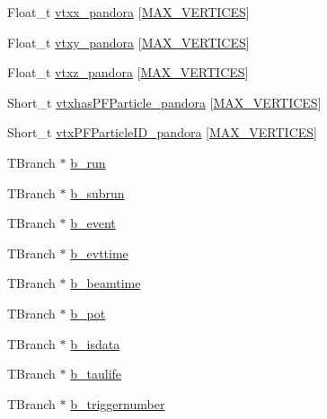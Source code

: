 \begin{DoxyCompactItemize}
\item 
Float\-\_\-t \hyperlink{classanatree_ae702221266aaf398574e6c0a4b956e41}{vtxx\-\_\-pandora} \mbox{[}\hyperlink{anatree__core__v09410002_8h_a6ac49acb0970e608315ca232a9fc8828}{M\-A\-X\-\_\-\-V\-E\-R\-T\-I\-C\-E\-S}\mbox{]}
\item 
Float\-\_\-t \hyperlink{classanatree_a3ada5e38c3707cf6b65ded5d0aed1be5}{vtxy\-\_\-pandora} \mbox{[}\hyperlink{anatree__core__v09410002_8h_a6ac49acb0970e608315ca232a9fc8828}{M\-A\-X\-\_\-\-V\-E\-R\-T\-I\-C\-E\-S}\mbox{]}
\item 
Float\-\_\-t \hyperlink{classanatree_a526781b4d6a3cf93890c000047381e8b}{vtxz\-\_\-pandora} \mbox{[}\hyperlink{anatree__core__v09410002_8h_a6ac49acb0970e608315ca232a9fc8828}{M\-A\-X\-\_\-\-V\-E\-R\-T\-I\-C\-E\-S}\mbox{]}
\item 
Short\-\_\-t \hyperlink{classanatree_aa870ef7aa82c721a5711a6ffae151c53}{vtxhas\-P\-F\-Particle\-\_\-pandora} \mbox{[}\hyperlink{anatree__core__v09410002_8h_a6ac49acb0970e608315ca232a9fc8828}{M\-A\-X\-\_\-\-V\-E\-R\-T\-I\-C\-E\-S}\mbox{]}
\item 
Short\-\_\-t \hyperlink{classanatree_a922454b767d4b26fcba1d0af5f3761b4}{vtx\-P\-F\-Particle\-I\-D\-\_\-pandora} \mbox{[}\hyperlink{anatree__core__v09410002_8h_a6ac49acb0970e608315ca232a9fc8828}{M\-A\-X\-\_\-\-V\-E\-R\-T\-I\-C\-E\-S}\mbox{]}
\item 
T\-Branch $\ast$ \hyperlink{classanatree_a19ee2ab2b10de562e5a32f375aa1470f}{b\-\_\-run}
\item 
T\-Branch $\ast$ \hyperlink{classanatree_a301b8c3822e751b592deefb4cbf276fb}{b\-\_\-subrun}
\item 
T\-Branch $\ast$ \hyperlink{classanatree_aff7d04fe7e6a48bed9288c487c70b730}{b\-\_\-event}
\item 
T\-Branch $\ast$ \hyperlink{classanatree_a5e1949d72f71c3126f5da8e8f5064152}{b\-\_\-evttime}
\item 
T\-Branch $\ast$ \hyperlink{classanatree_a18b90820427fcba7bd774a8479a49c97}{b\-\_\-beamtime}
\item 
T\-Branch $\ast$ \hyperlink{classanatree_afa7db061c3fa14487e00911096fe8cf8}{b\-\_\-pot}
\item 
T\-Branch $\ast$ \hyperlink{classanatree_a27613fdc12435fc6b2b2409eb47fdf08}{b\-\_\-isdata}
\item 
T\-Branch $\ast$ \hyperlink{classanatree_a362c47ff63b4ee60de88313c6b109017}{b\-\_\-taulife}
\item 
T\-Branch $\ast$ \hyperlink{classanatree_a9850c9d1ae369044f2ae1b6df6e203e9}{b\-\_\-triggernumber}

\end{DoxyCompactItemize}
